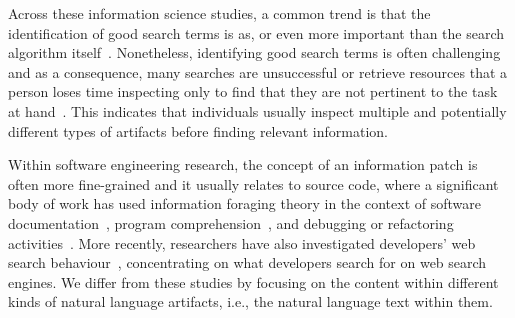 









Across these information science studies, 
a common trend is that the identification of good search terms is as, or even more
important than the search algorithm itself~\cite{Kevic2014}. 
Nonetheless, identifying good search terms is often challenging and 
as a consequence, many searches are unsuccessful or retrieve resources that 
a person loses time inspecting only to find that they are not pertinent to the task at hand~\cite{novotny2004don, Haiduc2013}.
This indicates that individuals usually inspect multiple and potentially different types of artifacts 
before finding relevant information.




Within software engineering research, the concept of an information patch 
is often more fine-grained and it usually relates to source code, where a significant body of work has 
used information foraging theory in the context of software documentation~\cite{Forward2002, DeGraaf2014, Wildemuth2012},
program comprehension~\cite{piorkowski2013, Ko2006a}, and debugging or refactoring activities~\cite{fleming2013, lawrance2010}. 
More recently, researchers have also investigated developers' web search 
behaviour~\cite{Starke2009, Brandt2009a, Xia2017}, concentrating on what developers search for on web search engines. 
We differ from these studies by focusing 
on the content within different kinds of natural language artifacts, i.e., 
the natural language text within them.






